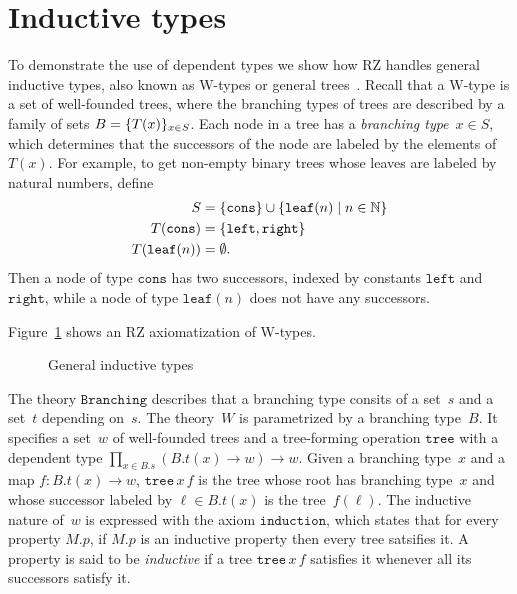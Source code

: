 \section{Inductive types}
\label{sec:outp-induct-types}

\label{sec:inductive-types}

To demonstrate the use of dependent types we show how RZ handles
general inductive types, also known as W-types or general
trees~\cite{nordstroem90:_progr_martin_type_theor}. Recall that a
W-type is a set of well-founded trees, where the branching types of
trees are described by a family of sets $B = \{T(x)\}_{x \in S}$.
Each node in a tree has a \emph{branching type}~$x \in S$, which
determines that the successors of the node are labeled by the elements
of~$T(x)$. For example, to get non-empty binary trees whose leaves are
labeled by natural numbers, define
%
\begin{align*}
  S &= \{\mathtt{cons}\} \cup \{\mathtt{leaf}(n) \mid n \in \mathbb{N}\}
  \\
  T(\mathtt{cons}) &= \{\mathtt{left}, \mathtt{right}\}
  \\
  T(\mathtt{leaf}(n)) &= \emptyset.
\end{align*}
%
Then a node of type $\mathtt{cons}$ has two successors, indexed by
constants $\mathtt{left}$ and $\mathtt{right}$, while a node of type
$\mathtt{leaf}(n)$ does not have any successors.

Figure~\ref{fig:wtype} shows an RZ axiomatization of W-types.
%
\begin{figure}
  \centering
  \caption{General inductive types}
  \label{fig:wtype}
\end{figure}
%
The theory $\mathtt{Branching}$ describes that a branching type
consits of a set~$s$ and a set~$t$ depending on~$s$. The theory~$W$ is
parametrized by a branching type~$B$. It specifies a set~$w$ of
well-founded trees and a tree-forming operation $\mathtt{tree}$ with a
dependent type $\prod_{x \in B.s} (B.t(x) \to w) \to w$. Given a
branching type~$x$ and a map $f : B.t(x) \to w$, $\mathtt{tree}\,x\,f$
is the tree whose root has branching type~$x$ and whose successor
labeled by $\ell \in B.t(x)$ is the tree~$f(\ell)$. The inductive
nature of~$w$ is expressed with the axiom $\mathtt{induction}$, which
states that for every property $M.p$, if $M.p$ is an inductive
property then every tree satsifies it. A property is said to be
\emph{inductive} if a tree $\mathtt{tree}\,x\,f$ satisfies it whenever
all its successors satisfy it.

